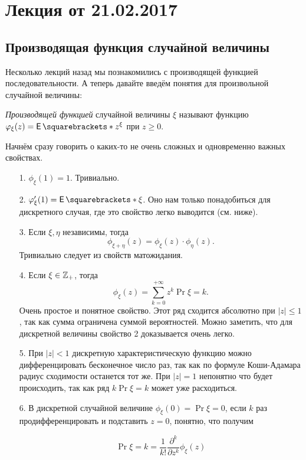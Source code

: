 \section{Лекция от 21.02.2017}

\subsection{Производящая функция случайной величины}

Несколько лекций назад мы познакомились с производящей функцией
последовательности. А теперь давайте введём понятия для произвольной случайной
величины:

\begin{definition}
  \textit{Производящей функцией} случайной величины $\xi$ называют
  функцию $\phi_{\xi}(z) = \E{z^{\xi}}$ при $z \geqslant 0$.
\end{definition}

Начнём сразу говорить о каких-то не очень сложных и одновременно важных
свойствах.

\begin{itemize}
  \item[1.] $\phi_{\xi}(1) = 1$. Тривиально.
  \item[2.] $\phi_{\xi}'(1) = \E{\xi}$. Оно нам только понадобиться для дискретного
  случая, где это свойство легко выводится (см. ниже).
  \item[3.] Если $\xi, \eta$ независимы, тогда
  \[
    \phi_{\xi + \eta}(z) = \phi_{\xi}(z) \cdot \phi_{\eta}(z).
  \]
  Тривиально следует из свойств матожидания.
  \item[4.] Если $\xi \in \mathbb{Z}_+$, тогда 
  \[
    \phi_{\xi}(z) = \sum\limits_{k = 0}^{+\infty} z^k\Pr{\xi = k}.
  \]
  Очень простое и понятное свойство. Этот ряд сходится абсолютно при $|z| \leq 1$,
  так как сумма ограничена суммой вероятностей.
  Можно заметить, что для дискретной величины свойство 2 доказывается очень легко.

  \item[5.] При $|z| < 1$ дискретную характеристическую функцию
  можно дифференцировать
  бесконечное число раз, так как по формуле Коши-Адамара радиус
  сходимости останется тот же. При $|z| = 1$ непонятно что будет происходить, так
  как ряд $k\Pr{\xi = k}$ может уже расходиться.

  \item[6.] В дискретной случайной величине $\phi_{\xi}(0) = \Pr{\xi = 0}$, если
  $k$ раз продифференцировать и подставить $z = 0$, понятно, что получим

  \[
    \Pr{\xi = k} = \frac{1}{k!}\frac{\partial^k}{\partial z^k}\phi_{\xi}(z)
  \]
\end{itemize}


